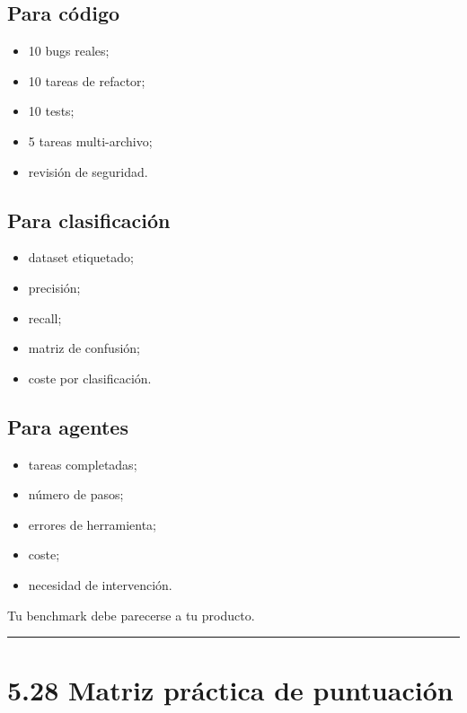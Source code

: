 \subsection{Para código}\label{para-cuxf3digo}

\begin{itemize}
\tightlist
\item
  10 bugs reales;
\item
  10 tareas de refactor;
\item
  10 tests;
\item
  5 tareas multi-archivo;
\item
  revisión de seguridad.
\end{itemize}

\subsection{Para clasificación}\label{para-clasificaciuxf3n}

\begin{itemize}
\tightlist
\item
  dataset etiquetado;
\item
  precisión;
\item
  recall;
\item
  matriz de confusión;
\item
  coste por clasificación.
\end{itemize}

\subsection{Para agentes}\label{para-agentes}

\begin{itemize}
\tightlist
\item
  tareas completadas;
\item
  número de pasos;
\item
  errores de herramienta;
\item
  coste;
\item
  necesidad de intervención.
\end{itemize}

Tu benchmark debe parecerse a tu producto.

\begin{center}\rule{0.5\linewidth}{0.5pt}\end{center}

\section{5.28 Matriz práctica de
puntuación}\label{matriz-pruxe1ctica-de-puntuaciuxf3n}

